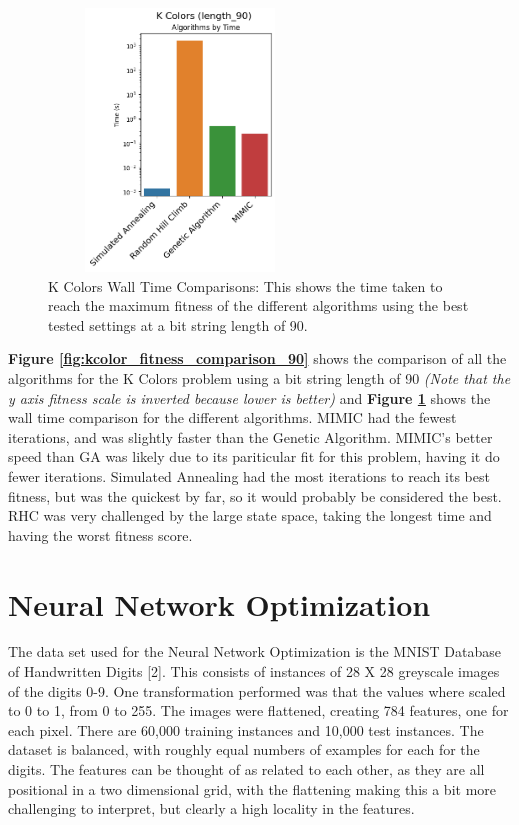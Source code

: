 \documentclass[letterpaper]{article} %
\begin{document}
\begin{figure}[!htb]
\centering
\includegraphics[width=2.75in, height=2.75in]{figures/K_Colors_length_90_Algorithms_by_Time_.png}
\caption{K Colors Wall Time Comparisons: This shows the time taken to reach the maximum fitness of the different algorithms using the best tested settings at a bit string length of 90.  }
\label{fig:kcolor_walltime_comparison_90}
\end{figure}

\textbf{Figure \ref{fig:kcolor_fitness_comparison_90}} shows the comparison of all the algorithms for the K Colors problem using a bit string length of 90 \emph{(Note that the y axis fitness scale is inverted because lower is better)} and \textbf{Figure \ref{fig:kcolor_walltime_comparison_90}} shows the wall time comparison for the different algorithms.  MIMIC had the fewest iterations, and was slightly faster than the Genetic Algorithm.  MIMIC's better speed than GA was likely due to its pariticular fit for this problem, having it do fewer iterations.  Simulated Annealing had the most iterations to reach its best fitness, but was the quickest by far, so it would probably be considered the best.  RHC was very challenged by the large state space, taking the longest time and having the worst fitness score.

\section{Neural Network Optimization}

The data set used for the Neural Network Optimization is the MNIST Database of Handwritten Digits [2].  This consists of instances of 28 X 28 greyscale images of the digits 0-9.  One transformation performed was that the values where scaled to 0 to 1, from 0 to 255.  The images were flattened, creating 784 features, one for each pixel.  There are 60,000 training instances and 10,000 test instances.  The dataset is balanced, with roughly equal numbers of examples for each for the digits.  The features can be thought of as related to each other, as they are all positional in a two dimensional grid, with the flattening making this a bit more challenging to interpret, but clearly a high locality in the features.  
\end{document}
